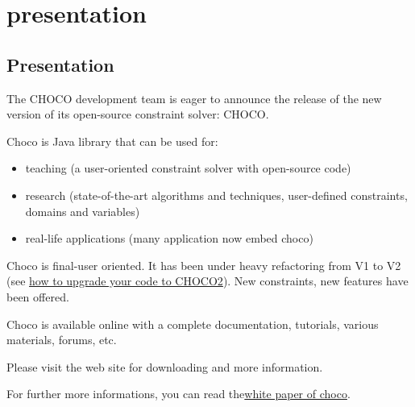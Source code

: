 \part{presentation}\label{presentation}

\chapter{Presentation}\label{sec:Presentation}
The CHOCO development team is eager to announce the release of the new version of its open-source constraint solver: CHOCO.

Choco is Java library that can be used for:
\begin{itemize}
	\item teaching (a user-oriented constraint solver with open-source code)
	\item research (state-of-the-art algorithms and techniques, user-defined constraints, domains and variables)
	\item real-life applications (many application now embed choco)
\end{itemize}

Choco is final-user oriented. It has been under heavy refactoring from V1 to V2 (see \href{sec:faq\#how\_do\_i\_upgrade\_my\_program\_to\_choco2.0}{how to upgrade your code to CHOCO2}). New constraints, new features have been offered.

Choco is available online with a complete documentation, tutorials, various materials, forums, etc.

Please visit the web site for downloading and more information.


For further more informations, you can read the\href{media/pdf/choco-presentation.pdf}{white paper of choco}.
